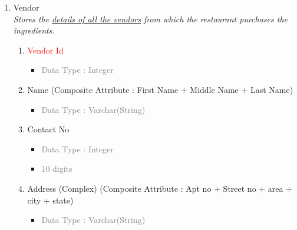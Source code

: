 \begin{enumerate}
        \item Vendor \\
        \textit{Stores the \underline{details of all the vendors} from which the restaurant purchases the ingredients.}
            \begin{enumerate}[label=\alph*.]
                \item\textcolor{red}{Vendor Id}
                    \begin{itemize}[label=-]
                        \item \textcolor{gray}{Data Type : Integer}
                    \end{itemize}
                \item Name (Composite Attribute : First Name + Middle Name + Last Name)
                    \begin{itemize}[label=-]
                        \item \textcolor{gray}{Data Type : Varchar(String)}
                    \end{itemize}
                \item Contact No
                    \begin{itemize}[label=-]
                        \item \textcolor{gray}{Data Type : Integer}
                        \item \textcolor{gray}{10 digits}
                    \end{itemize}
                \item Address (Complex) (Composite Attribute : Apt no + Street no + area + city + state)
                    \begin{itemize}[label=-]
                        \item \textcolor{gray}{Data Type : Varchar(String)}
                    \end{itemize}
            \end{enumerate}
        

\end{enumerate}
